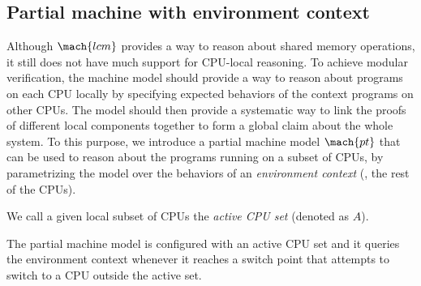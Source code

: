 \subsection{Partial machine with environment context}
\label{ssec:spec:pt}

Although $\mach{lcm}$ provides a way to reason about shared memory operations,
it still does not have much support for CPU-local reasoning.
To achieve modular verification, the machine model should provide
a way to reason about programs on each CPU locally by specifying
expected behaviors of the context programs on other CPUs. The model
should then provide a systematic
way to link the proofs of different local components together to form a global
claim about the whole system. To this purpose, we introduce a partial
machine model $\mach{pt}$ that can be used to reason about the
programs running on a subset of CPUs, by
parametrizing the model over the behaviors of an \emph{environment context}
(\ie, the rest of the CPUs).

We call a given local subset of CPUs the \emph{active CPU set} 
(denoted as $A$).
The partial machine model is configured with an active CPU set
and it queries the environment context whenever it reaches a switch point
that attempts to switch to a CPU outside the active set.

